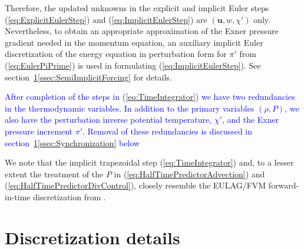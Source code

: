 \documentclass{ametsoc}
\theoremstyle{definition}
\newcommand{\klein}[1]{\textcolor{blue}{#1}}
\newcommand{\eq}[1]{(\ref{#1})}
\newcommand{\vect}[1]{{\mathbf{#1}}}
\newcommand{\vu}{\vect{u}}
\newcommand{\chiprime}{{\chi'}}
\newcommand{\piprime}{\pi'}
\begin{document}
Therefore, the updated unknowns in the explicit and 
implicit Euler steps \eq{eq:ExplicitEulerStep} and \eq{eq:ImplicitEulerStep} 
are $(\vu, w, \chiprime)$ only. Nevertheless, to obtain 
an appropriate approximation of the Exner pressure gradient needed in the 
momentum equation, an auxiliary implicit Euler discretization of the energy 
equation in perturbation form for $\piprime$ from \eq{eq:EulerPiPrime} is 
used in formulating \eq{eq:ImplicitEulerStep}. See 
section~\ref{sec:DiscretizationDetails}\ref{ssec:SemiImplicitForcing} for details. 




\klein{After completion of the steps in \eq{eq:TimeIntegrator} we have 
two redundancies in the thermodynamic variables. In addition to the
primary variables $(\rho, P)$, we also have the perturbation inverse
potential temperature, $\chi'$, and the Exner pressure increment $\pi'$. 
Removal of these redundancies is discussed in 
section~\ref{sec:DiscretizationDetails}\ref{ssec:Synchronization} below}

We note that the implicit trapezoidal step \eq{eq:TimeIntegrator} and, 
to a lesser extent the treatment of the $P$ in 
\eq{eq:HalfTimePredictorAdvection} and \eq{eq:HalfTimePredictorDivControl}, 
closely resemble the EULAG/FVM forward-in-time discretization from 
\citep{SmolarkiewiczMargolin1997,PrusaEtAl2008,SmolarkiewiczEtAl2014,SmolarkiewiczEtAl2016, KuehnleinEtAl2018}.




\section{Discretization details}
\label{sec:DiscretizationDetails}

\end{document}
